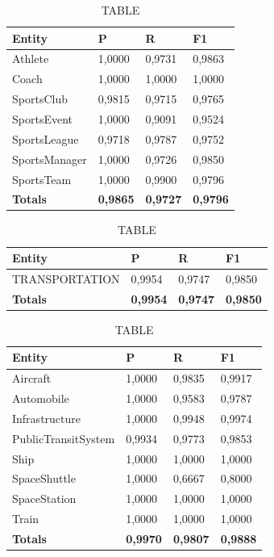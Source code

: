 \documentclass[thesis=M,english]{FITthesis}[2018/05/30]
\begin{document}
	\begin{table}[H]\centering
		\caption{TABLE}
		\label{}
		\begin{tabular}{|l|l|l|l|}
			\hline {\textbf{Entity}} & {\textbf{P}} & {\textbf{R}} & {\textbf{F1}}\\\hline
				Athlete & 1,0000 & 0,9731 & 0,9863\\
				Coach & 1,0000 & 1,0000 & 1,0000\\
				SportsClub & 0,9815 & 0,9715 & 0,9765\\
				SportsEvent & 1,0000 & 0,9091 & 0,9524\\
				SportsLeague & 0,9718 & 0,9787 & 0,9752\\
				SportsManager & 1,0000 & 0,9726 & 0,9850\\				
				SportsTeam & 1,0000 & 0,9900 & 0,9796\\\hline
				\textbf{Totals} & \textbf{0,9865} & \textbf{0,9727} & \textbf{0,9796}\\\hline
		\end{tabular}
	\end{table}	

	\begin{table}[H]\centering
		\caption{TABLE}
		\label{}
		\begin{tabular}{|l|l|l|l|}
			\hline {\textbf{Entity}} & {\textbf{P}} & {\textbf{R}} & {\textbf{F1}}\\\hline
				TRANSPORTATION & 0,9954 & 0,9747 & 0,9850\\\hline
				\textbf{Totals} & \textbf{0,9954} & \textbf{0,9747} & \textbf{0,9850}\\\hline
		\end{tabular}
	\end{table}
	
	
	\begin{table}[H]\centering
		\caption{TABLE}
		\label{}
		\begin{tabular}{|l|l|l|l|}
			\hline {\textbf{Entity}} & {\textbf{P}} & {\textbf{R}} & {\textbf{F1}}\\\hline
				Aircraft & 1,0000 & 0,9835 & 0,9917\\
				Automobile & 1,0000 & 0,9583 & 0,9787\\				
				Infrastructure & 1,0000 & 0,9948 & 0,9974\\
				PublicTransitSystem & 0,9934 & 0,9773 & 0,9853\\
				Ship & 1,0000 & 1,0000 & 1,0000\\				
				SpaceShuttle & 1,0000 & 0,6667 & 0,8000\\
				SpaceStation & 1,0000 & 1,0000 & 1,0000\\
				Train & 1,0000 & 1,0000 & 1,0000\\\hline
				\textbf{Totals} & \textbf{0,9970} & \textbf{0,9807} & \textbf{0,9888}\\\hline
		\end{tabular}
	\end{table}	
\end{document}
